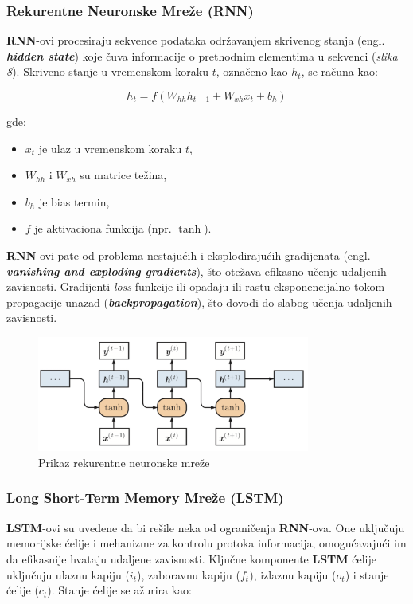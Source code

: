 \documentclass[12pt]{article}
\begin{document}
   \subsubsection{Rekurentne Neuronske Mreže (RNN)}
   \textbf{RNN}-ovi procesiraju sekvence podataka održavanjem skrivenog stanja (engl. \textbf{\textit{hidden state}}) 
   koje čuva informacije o prethodnim elementima u sekvenci (\textit{slika 8}). 
   Skriveno stanje u vremenskom koraku \( t \), označeno kao \( h_t \), se računa kao:

   \[ h_t = f(W_{hh} h_{t-1} + W_{xh} x_t + b_h) \]

   gde:
   \begin{itemize}
      \vspace{-0.5cm}
      \setlength\itemsep{0.2em} %
      \item \( x_t \) je ulaz u vremenskom koraku \( t \),
      \item \( W_{hh} \) i \( W_{xh} \) su matrice težina,
      \item \( b_h \) je bias termin,
      \item \( f \) je aktivaciona funkcija (npr. \(\tanh\)).
   \end{itemize}

   \textbf{RNN}-ovi pate od problema nestajućih i eksplodirajućih gradijenata (engl. \textbf{\textit{vanishing and exploding gradients}}), 
   što otežava efikasno učenje udaljenih zavisnosti. Gradijenti \textit{loss} funkcije ili opadaju ili rastu 
   eksponencijalno tokom propagacije unazad (\textbf{\textit{backpropagation}}), što dovodi 
   do slabog učenja udaljenih zavisnosti.
   
   \begin{figure}[h!]
      \centering
      \vspace{1.5cm} %
      \includegraphics[width=0.8\textwidth]{rnn.png}
      \caption{Prikaz rekurentne neuronske mreže}
      \label{fig:rnn}
   \end{figure}

   \subsubsection{Long Short-Term Memory Mreže (LSTM)}
   \textbf{LSTM}-ovi su uvedene da bi rešile neka od ograničenja \textbf{RNN}-ova. 
   One uključuju memorijske ćelije i mehanizme za kontrolu protoka informacija, 
   omogućavajući im da efikasnije hvataju udaljene zavisnosti. Ključne komponente \textbf{LSTM} ćelije 
   uključuju ulaznu kapiju (\( i_t \)), zaboravnu kapiju (\( f_t \)), izlaznu kapiju (\( o_t \)) i 
   stanje ćelije (\( c_t \)). Stanje ćelije se ažurira kao:
\end{document}
